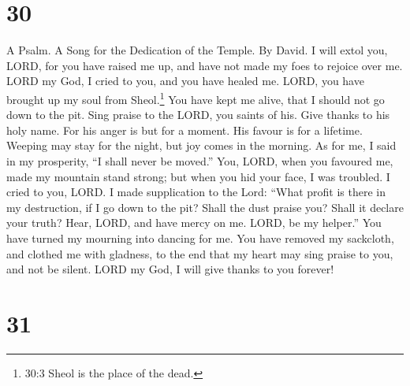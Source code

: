 \hypertarget{section-29}{%
\section{30}\label{section-29}}

A Psalm. A Song for the Dedication of the Temple. By David. 
I will extol you, LORD, for you have raised me up, and have not made my
foes to rejoice over me.  LORD my God, I cried to you, and
you have healed me.  LORD, you have brought up my soul from
Sheol.\footnote{30:3 Sheol is the place of the dead.} You have kept me
alive, that I should not go down to the pit.  Sing praise to
the LORD, you saints of his. Give thanks to his holy name. 
For his anger is but for a moment. His favour is for a lifetime. Weeping
may stay for the night, but joy comes in the morning.  As
for me, I said in my prosperity, ``I shall never be moved.''
 You, LORD, when you favoured me, made my mountain stand
strong; but when you hid your face, I was troubled.  I cried
to you, LORD. I made supplication to the Lord:  ``What
profit is there in my destruction, if I go down to the pit? Shall the
dust praise you? Shall it declare your truth?  Hear, LORD,
and have mercy on me. LORD, be my helper.''  You have
turned my mourning into dancing for me. You have removed my sackcloth,
and clothed me with gladness,  to the end that my heart may
sing praise to you, and not be silent. LORD my God, I will give thanks
to you forever!

\hypertarget{section-30}{%
\section{31}\label{section-30}}

